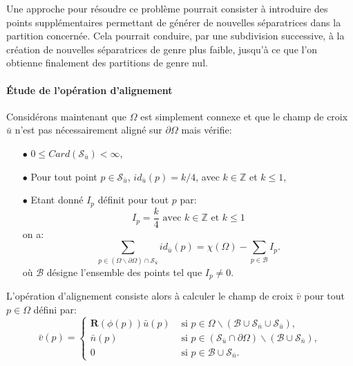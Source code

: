 Une approche pour résoudre ce problème pourrait consister à introduire des points supplémentaires permettant de générer de nouvelles séparatrices dans la partition concernée. Cela pourrait conduire, par une subdivision successive, à la création de nouvelles séparatrices de genre plus faible, jusqu'à ce que l'on obtienne finalement des partitions de genre nul.



\paragraph{\'Etude de l'opération d'alignement}

Considérons maintenant que $\Omega$ est simplement connexe et que le champ de croix $\bar{u}$ n'est pas nécessairement aligné sur $\partial\Omega$ mais vérifie:
\begin{itemize}
 \item[$\bullet$] $0\leq Card(\mathcal{S}_{\bar{u}})<\infty$,\\
 \item[$\bullet$] Pour tout point $p\in\mathcal{S}_{\bar{u}}$, $id_{\bar{u}}(p)=k/4$, avec $k\in\mathbb{Z}$ et $k\leq 1$,\\
 \item[$\bullet$] Etant donné $I_p$ définit pour tout $p$ par:
\begin{equation}
I_p=\displaystyle\frac{k}{4}\mbox{ avec }k\in\mathbb{Z}\mbox{ et }k\leq 1
\end{equation}
on a:
 \begin{equation}
    \label{eqn:principe_hypothese_u_space}
    \sum_{p\in(\Omega\backslash\partial\Omega)\cap\mathcal{S}_{\bar{u}}}id_{\bar{u}}(p)=\chi(\Omega)-\sum_{p\in\mathcal{B}}I_p.
\end{equation}
où $\mathcal{B}$ désigne l'ensemble des points tel que $I_p\neq 0$.\\
\end{itemize}
L'opération d'alignement consiste alors à calculer le champ de croix $\bar{v}$ pour tout $p\in\Omega$ défini par:
\begin{equation}
\bar{v}(p)=
\left\{
\begin{array}{ll}
\mathbf{R}(\phi(p))\bar{u}(p) & \mbox{ si } p\in\Omega\backslash(\mathcal{B}\cup\mathcal{S}_{\bar{n}}\cup\mathcal{S}_{\bar{u}}),\\[0.5cm]
\bar{n}(p) & \mbox{ si } p\in(\mathcal{S}_{\bar{u}}\cap\partial\Omega)\backslash(\mathcal{B}\cup\mathcal{S}_{\bar{n}}),\\[0.5cm]
0 & \mbox{ si } p\in\mathcal{B}\cup\mathcal{S}_{\bar{n}}.
\end{array}
\right.
\label{eqn:principe_def_v_space}
\end{equation}
